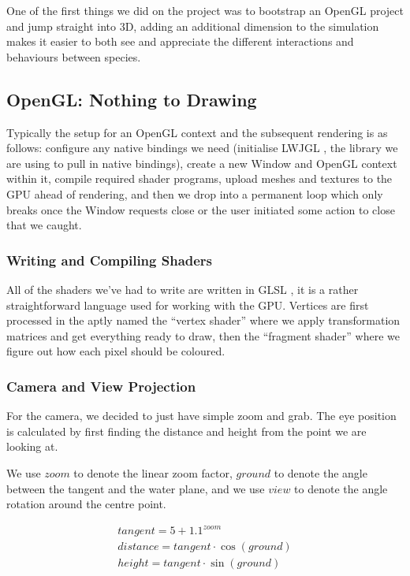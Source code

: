 \documentclass{article}
\begin{document}
\begin{multicols}{2}
            One of the first things we did on the project was to bootstrap an OpenGL project and jump straight into 3D, adding an additional dimension to the simulation makes it easier to both see and appreciate the different interactions and behaviours between species.

            \subsection{OpenGL: Nothing to Drawing}

                Typically the setup for an OpenGL context and the subsequent rendering is as follows: configure any native bindings we need (initialise LWJGL \cite{LWJGL}, the library we are using to pull in native bindings), create a new Window and OpenGL context within it, compile required shader programs, upload meshes and textures to the GPU ahead of rendering, and then we drop into a permanent loop which only breaks once the Window requests close or the user initiated some action to close that we caught.

                \subsubsection{Writing and Compiling Shaders}

                    All of the shaders we've had to write are written in GLSL \cite{GLSL}, it is a rather straightforward language used for working with the GPU. Vertices are first processed in the aptly named the ``vertex shader'' where we apply transformation matrices and get everything ready to draw, then the ``fragment shader'' where we figure out how each pixel should be coloured. 

                \subsubsection{Camera and View Projection}

                    For the camera, we decided to just have simple zoom and grab. The eye position is calculated by first finding the distance and height from the point we are looking at.

                    We use $zoom$ to denote the linear zoom factor, $ground$ to denote the angle between the tangent and the water plane, and we use $view$ to denote the angle rotation around the centre point.

                    \[
                        \begin{array}{l}
                            tangent = 5 + 1.1^{zoom} \\
                            distance = tangent \cdot \cos(ground) \\
                            height = tangent \cdot \sin(ground)
                        \end{array}
                    \]


\end{multicols}
\end{document}
